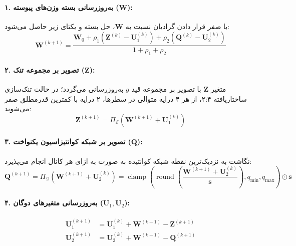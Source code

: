\paragraph{۱. به‌روزرسانی بسته وزن‌های پیوسته ($\mathbf{W}$):}
با صفر قرار دادن گرادیان نسبت به $\mathbf{W}$، حل بسته و یکتای زیر حاصل می‌شود:
\begin{equation}
\mathbf{W}^{(k+1)} = \frac{\mathbf{W}_0 + \rho_1 (\mathbf{Z}^{(k)} - \mathbf{U}_1^{(k)}) + \rho_2 (\mathbf{Q}^{(k)} - \mathbf{U}_2^{(k)})}{1 + \rho_1 + \rho_2}
\end{equation}

\paragraph{۲. تصویر بر مجموعه تنک ($\mathbf{Z}$):}
متغیر $\mathbf{Z}$ با تصویر بر مجموعه قید $g$ به‌روزرسانی می‌گردد؛ در حالت تنک‌سازی ساختاریافته ۲:۴، از هر ۴ درایه متوالی در سطرها، ۲ درایه با کمترین قدرمطلق صفر می‌شوند:
\begin{equation}
\mathbf{Z}^{(k+1)} = \Pi_{\mathcal{S}}\left(\mathbf{W}^{(k+1)} + \mathbf{U}_1^{(k)}\right)
\end{equation}

\paragraph{۳. تصویر بر شبکه کوانتیزاسیون یکنواخت ($\mathbf{Q}$):}
نگاشت به نزدیک‌ترین نقطه شبکه کوانتیده به صورت به ازای هر کانال انجام می‌پذیرد:
\begin{equation}
\mathbf{Q}^{(k+1)} = \Pi_{\mathcal{Q}}\left(\mathbf{W}^{(k+1)} + \mathbf{U}_2^{(k)}\right) = \operatorname{clamp}\left(\operatorname{round}\left(\frac{\mathbf{W}^{(k+1)} + \mathbf{U}_2^{(k)}}{\mathbf{s}}\right), q_{\min}, q_{\max}\right) \odot \mathbf{s}
\end{equation}

\paragraph{۴. به‌روزرسانی متغیرهای دوگان ($\mathbf{U}_1, \mathbf{U}_2$):}
\begin{align}
\mathbf{U}_1^{(k+1)} &= \mathbf{U}_1^{(k)} + \mathbf{W}^{(k+1)} - \mathbf{Z}^{(k+1)} \\
\mathbf{U}_2^{(k+1)} &= \mathbf{U}_2^{(k)} + \mathbf{W}^{(k+1)} - \mathbf{Q}^{(k+1)}
\end{align}

